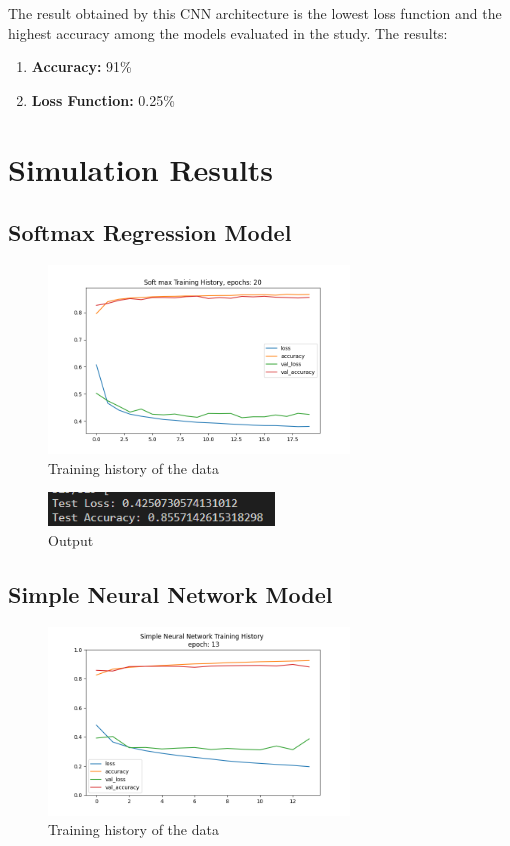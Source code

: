 \documentclass{article}
\begin{document}
The result obtained by this CNN architecture is the lowest loss function and the highest accuracy among the models evaluated in the study.
The results:
\begin{enumerate}
    \item \textbf{Accuracy: } 91\%

    \item \textbf{Loss Function: } 0.25\%

\end{enumerate}

\newpage
\section{Simulation Results}

\subsection{Softmax Regression Model}

\begin{figure}[H]
    \caption{Training history of the data}
    \centering
    \includegraphics[width=8cm]{imgFolder/softMax_fig.png}
\end{figure}

\begin{figure}[H]
    \caption{Output}
    \centering
    \includegraphics[width=6cm]{imgFolder/softMaxResult.png}
\end{figure}

\subsection{Simple Neural Network Model}

\begin{figure}[H]
    \caption{Training history of the data}
    \centering
    \includegraphics[width=8cm]{imgFolder/simpleNeuralNetwork_fig.png}
\end{figure}
\end{document}
